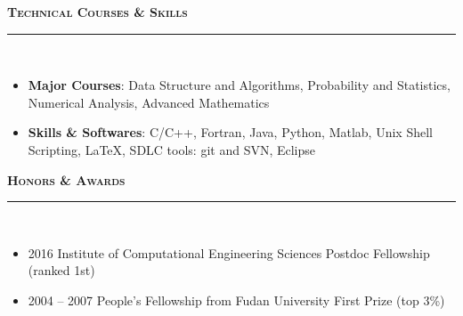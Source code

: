 \documentclass[11pt]{article}
\begin{document}
\textbf{\textsc{\LARGE{Technical Courses \& Skills}}} \\ \rule[0.8em]{\textwidth}{0.5pt} \\[-18pt]

\begin{itemize}[topsep=0pt,partopsep=0pt,leftmargin=16pt]
\item \textbf{Major Courses}: 
Data Structure and Algorithms, Probability and Statistics,  Numerical Analysis, Advanced Mathematics


\item \textbf{Skills \& Softwares}: 
C/C++, 
Fortran, 
Java,
Python, 
Matlab, 
Unix Shell Scripting, 
\LaTeX,
SDLC tools: git and SVN,
Eclipse

\end{itemize}

\vspace{6pt}

\textbf{\textsc{\LARGE{Honors \& Awards}}} \\ \rule[0.8em]{\textwidth}{0.5pt} \\[-18pt]

\begin{itemize}[topsep=0pt,partopsep=0pt,leftmargin=16pt]
\item 2016 Institute of Computational Engineering Sciences Postdoc Fellowship (ranked 1st)
\item 2004 -- 2007 People's Fellowship from Fudan University First Prize (top 3\%)
\end{itemize}

\vspace{2pt}
%
\end{document}

